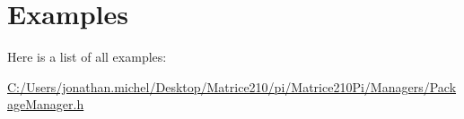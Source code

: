 \section{Examples}
Here is a list of all examples\+:\begin{DoxyCompactItemize}
\item 
\mbox{\hyperlink{_c_1_2_users_2jonathan_8michel_2_desktop_2_matrice210_2pi_2_matrice210_pi_2_managers_2_package_manager_8h-example}{C\+:/\+Users/jonathan.\+michel/\+Desktop/\+Matrice210/pi/\+Matrice210\+Pi/\+Managers/\+Package\+Manager.\+h}}
\end{DoxyCompactItemize}
